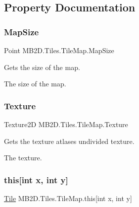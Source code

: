 \subsection{Property Documentation}
\hypertarget{class_m_b2_d_1_1_tiles_1_1_tile_map_a1132945901a5228f1e58d38945b13eeb}{}\label{class_m_b2_d_1_1_tiles_1_1_tile_map_a1132945901a5228f1e58d38945b13eeb} 
\subsubsection{\texorpdfstring{Map\+Size}{MapSize}}
{\footnotesize\ttfamily Point M\+B2\+D.\+Tiles.\+Tile\+Map.\+Map\+Size\hspace{0.3cm}{\ttfamily [get]}}



Gets the size of the map. 

The size of the map.\hypertarget{class_m_b2_d_1_1_tiles_1_1_tile_map_a0f5a6cdcd141ab461f7b8bf316e71a9f}{}\label{class_m_b2_d_1_1_tiles_1_1_tile_map_a0f5a6cdcd141ab461f7b8bf316e71a9f} 
\subsubsection{\texorpdfstring{Texture}{Texture}}
{\footnotesize\ttfamily Texture2D M\+B2\+D.\+Tiles.\+Tile\+Map.\+Texture\hspace{0.3cm}{\ttfamily [get]}}



Gets the texture atlases undivided texture. 

The texture.\hypertarget{class_m_b2_d_1_1_tiles_1_1_tile_map_a1d25bbc810a7a2664d09d734aada5490}{}\label{class_m_b2_d_1_1_tiles_1_1_tile_map_a1d25bbc810a7a2664d09d734aada5490} 
\subsubsection{\texorpdfstring{this[int x, int y]}{this[int x, int y]}}
{\footnotesize\ttfamily \hyperlink{class_m_b2_d_1_1_tile}{Tile} M\+B2\+D.\+Tiles.\+Tile\+Map.\+this\mbox{[}int x, int y\mbox{]}\hspace{0.3cm}{\ttfamily [get]}}



